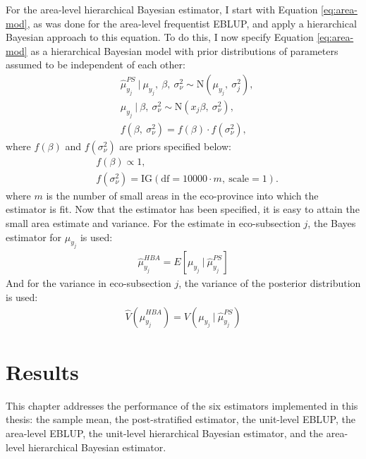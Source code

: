 \documentclass[12pt,twoside]{reedthesis}
\begin{document}
For the area-level hierarchical Bayesian estimator, I start with Equation \eqref{eq:area-mod}, as was done for the area-level frequentist EBLUP, and apply a hierarchical Bayesian approach to this equation. To do this, I now specify Equation \eqref{eq:area-mod} as a hierarchical Bayesian model with prior distributions of parameters assumed to be independent of each other:
\begin{align}
&\hat\mu_{y_j}^{PS} ~\vert~ \mu_{y_j},~ \beta,~ \sigma^2_\nu \sim \text{N}(\mu_{y_j},~ \sigma^2_j), \nonumber \\
&\mu_{y_j} ~\vert~ \beta,~ \sigma^2_\nu \sim \text{N}(x_j\beta,~ \sigma^2_\nu),\nonumber \\
&f(\beta,~ \sigma^2_\nu) = f(\beta)\cdot f(\sigma^2_\nu),
\end{align}
where \(f(\beta)\) and \(f(\sigma^2_\nu)\) are priors specified below:
\begin{align*}
&f(\beta) \propto 1, \\
&f(\sigma^2_\nu) = \text{IG}(\text{df} = 10000 \cdot m,~ \text{scale} = 1).
\end{align*}
where \(m\) is the number of small areas in the eco-province into which the estimator is fit. Now that the estimator has been specified, it is easy to attain the small area estimate and variance. For the estimate in eco-subsection \(j\), the Bayes estimator for \(\mu_{y_j}\) is used:
\begin{align}
\hat\mu_{y_j}^{HBA} = E[\mu_{y_j} ~\vert~ \hat\mu_{y_j}^{PS}] 
\end{align}
And for the variance in eco-subsection \(j\), the variance of the posterior distribution is used:
\begin{align}
\hat V(\hat\mu_{y_j}^{HBA}) = V(\mu_{y_j} ~\vert~ \hat\mu_{y_j}^{PS})
\end{align}
\hypertarget{results}{%
\chapter{Results}\label{results}}

This chapter addresses the performance of the six estimators implemented in this thesis: the sample mean, the post-stratified estimator, the unit-level EBLUP, the area-level EBLUP, the unit-level hierarchical Bayesian estimator, and the area-level hierarchical Bayesian estimator.
\end{document}
